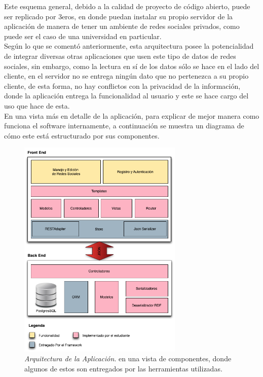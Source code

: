 Este esquema general, debido a la calidad de proyecto de código abierto, puede ser replicado por 3eros, en donde puedan instalar su propio servidor de la aplicación de manera de tener un ambiente de redes sociales privados, como puede ser el caso de una universidad en particular.\\

Según lo que se comentó anteriormente, esta arquitectura posee la potencialidad de integrar diversas otras aplicaciones que usen este tipo de datos de redes sociales, sin embargo, como la lectura en sí de los datos sólo se hace en el lado del cliente, en el servidor no se entrega ningún dato que no pertenezca a su propio cliente, de esta forma, no hay conflictos con la privacidad de la información, donde la aplicación entrega la funcionalidad al usuario y este se hace cargo del uso que hace de esta.\\

En una vista más en detalle de la aplicación, para explicar de mejor manera como funciona el software internamente, a continuación se muestra un diagrama de cómo este está estructurado por sus componentes.

\begin{figure}[H]
  \centering
  \includegraphics[width=0.7\textwidth]{images/arquitectura_de_software.png}
  \caption[Arquitectura de la Aplicación]{\emph{Arquitectura de la Aplicación}. en una vista de componentes, donde algunos de estos son entregados por las herramientas utilizadas.}
  \label{arquitectura_de_software}
\end{figure}

